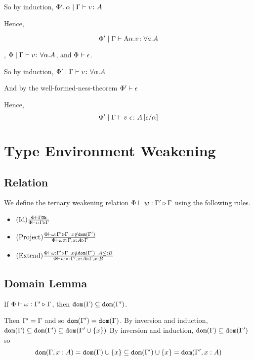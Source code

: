 {    So by induction, $\Phi', \alpha\mid\Gamma \vdash v \colon A$

    Hence,

    \begin{equation}
        \Phi'\mid\Gamma \vdash \Lambda \alpha. v \colon \forall a. A
    \end{equation}


    \bi, $\Phi\mid\Gamma \vdash v \colon \forall \alpha. A$, and $\Phi\vdash \epsilon$.

    So by induction, $\Phi'\mid\Gamma \vdash v \colon \forall \alpha. A$

    And by the well-formed-ness-theorem $\Phi'\vdash \epsilon$

    Hence, \begin{equation}
        \Phi'\mid\Gamma \vdash v\;\epsilon \colon A\left[\epsilon / \alpha\right]
    \end{equation}

    \section{Type Environment Weakening}
    \subsection{Relation}
    We define the ternary weakening relation $\Phi\vdash w : \Gamma' \triangleright \Gamma$ using the following rules.


    \begin{itemize}
        \item $(\text{Id}) \frac{\Phi\vdash \Gamma \texttt{Ok}}{\Phi\vdash \iota : \Gamma \triangleright \Gamma}$
        \item $(\text{Project}) \frac{\Phi\vdash \omega : \Gamma' \triangleright \Gamma\;\; x \notin \texttt{dom}(\Gamma')}{\Phi\vdash \omega \pi : \Gamma, x: A \triangleright \Gamma}$
        \item $(\text{Extend}) \frac{\Phi\vdash \omega : \Gamma' \triangleright \Gamma\;\; x \notin \texttt{dom}(\Gamma')\;\; A \leq: B}{\Phi\vdash w \times : \Gamma', x: A \triangleright \Gamma, x: B}$
    \end{itemize}

    \subsection{Domain Lemma}
    If $\Phi\vdash \omega : \Gamma' \triangleright \Gamma$, then $\texttt{dom}(\Gamma)\subseteq \texttt{dom}(\Gamma')$.

    \proof
    Then $\Gamma' = \Gamma$ and so $\texttt{dom}(\Gamma') = \texttt{dom}(\Gamma)$.
    By inversion and induction, $\texttt{dom}(\Gamma)\subseteq\texttt{dom}(\Gamma')\subseteq\texttt{dom}(\Gamma'\cup\left\{x\right\})$
    By inversion and induction, $\texttt{dom}(\Gamma)\subseteq\texttt{dom}(\Gamma')$ so 
    $$\texttt{dom}(\Gamma, x: A) = \texttt{dom}(\Gamma)\cup\left\{x\right\} \subseteq\texttt{dom}(\Gamma')\cup\left\{x\right\} = \texttt{dom}(\Gamma',x:A)$$
}
